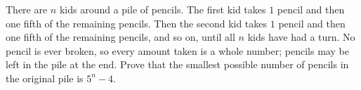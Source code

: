 There are $n$ kids around a pile of pencils. The first kid takes $1$ pencil and then one fifth of the remaining pencils. Then the second kid takes $1$ pencil and then one fifth of the remaining pencils, and so on, until all $n$ kids have had a turn. No pencil is ever broken, so every amount taken is a whole number; pencils may be left in the pile at the end. Prove that the smallest possible number of pencils in the original pile is $5^n-4$.
